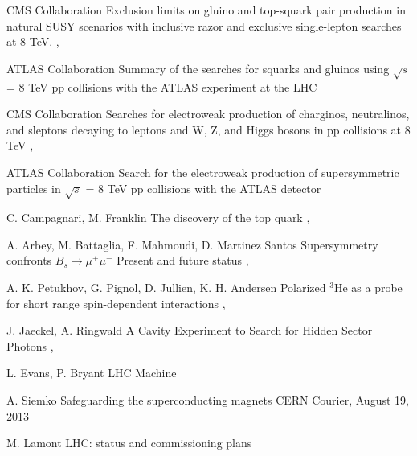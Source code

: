 {CMS Collaboration}
{Exclusion limits on gluino and top-squark pair production in natural SUSY scenarios with inclusive razor and exclusive single-lepton searches at 8 TeV.}
{, }

{ATLAS Collaboration}
{Summary of the searches for squarks and gluinos using $\sqrt{s}$ = 8 TeV pp collisions with the ATLAS experiment at the LHC}
{ }

{CMS Collaboration}
{Searches for electroweak production of charginos, neutralinos, and sleptons decaying to leptons and W, Z, and Higgs bosons in pp collisions at 8 TeV}
{, }

{ATLAS Collaboration}
{Search for the electroweak production of supersymmetric particles in $\sqrt{s}$ = 8 TeV pp collisions with the ATLAS detector}
{}


{C. Campagnari, M. Franklin}
{The discovery of the top quark}
{, }

{A. Arbey, M. Battaglia, F. Mahmoudi, D. Martinez Santos}
{Supersymmetry confronts $B_s \rightarrow \mu^+ \mu^-$ Present and future status}
{, }

{A. K. Petukhov, G. Pignol, D. Jullien, K. H. Andersen}
{Polarized $^3$He as a probe for short range spin-dependent interactions}
{, }

{J. Jaeckel, A. Ringwald}
{A Cavity Experiment to Search for Hidden Sector Photons}
{, }

{L. Evans, P. Bryant}
{LHC Machine}
{}

{A. Siemko}
{Safeguarding the superconducting magnets}
{CERN Courier, August 19, 2013}

{M. Lamont}
{LHC: status and commissioning plans}
{}

